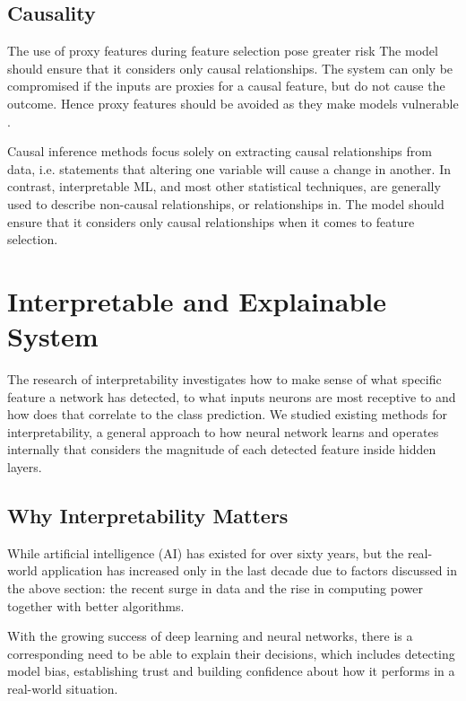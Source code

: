 \subsection*{Causality}

The use of proxy features during feature selection pose greater risk 
The model should ensure that it considers only causal relationships.  The system can only be compromised if the inputs are proxies for a causal feature, but do not cause the outcome. Hence proxy features should be avoided as they make models vulnerable \cite{molnar}.

Causal inference methods focus solely on extracting causal relationships from data, i.e. statements that altering one variable will cause a change in another. In contrast, interpretable ML, and most other statistical techniques, are generally used to describe non-causal relationships, or relationships in. The model should ensure that it considers only causal relationships when it comes to feature selection.

\section{Interpretable and Explainable System}

The research of interpretability investigates how to make sense of what specific feature a network has detected, to what inputs neurons are most receptive to and how does that correlate to the class prediction. We studied existing methods for interpretability, a general approach to how neural network learns and operates internally that considers the magnitude of each detected feature inside hidden layers.

\subsection{Why Interpretability Matters}

While artificial intelligence (AI) has existed for over sixty years, but the real-world application has increased only in the last decade due to factors discussed in the above section: the recent surge in data and the rise in computing power together with better algorithms.

With the growing success of deep learning and neural networks, there is a corresponding need to be able to explain their decisions, which includes detecting model bias, establishing trust and building confidence about how it performs in a real-world situation.

